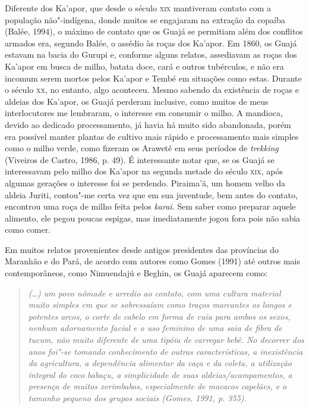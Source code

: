 Diferente dos Ka'apor, que desde o século \textsc{xix} mantiveram contato com a
população não"-indígena, donde muitos se engajaram na extração da copaíba
(Balée, 1994), o máximo de contato que os Guajá se permitiam além dos
conflitos armados era, segundo Balée, o assédio às roças dos Ka'apor. Em
1860, os Guajá estavam na bacia do Gurupi e, conforme alguns relatos,
assediavam as roças dos Ka'apor em busca de milho, batata doce, cará e
outros tubérculos, e não era incomum serem mortos pelos Ka'apor e Tembé
em situações como estas. Durante o século \textsc{xx}, no entanto, algo
aconteceu. Mesmo sabendo da existência de roças e aldeias dos Ka'apor,
os Guajá perderam inclusive, como muitos de meus interlocutores me
lembraram, o interesse em consumir o milho. A mandioca, devido ao
dedicado processamento, já havia há muito sido abandonada, porém era
possível manter plantas de cultivo mais rápido e processamento mais
simples como o milho verde, como fizeram os Araweté em seus períodos de
\emph{trekking} (Viveiros de Castro, 1986, p. 49). É interessante notar
que, se os Guajá se interessavam pelo milho dos Ka'apor na segunda
metade do século \textsc{xix}, após algumas gerações o interesse foi se perdendo.
Piraima'ã, um homem velho da aldeia Juriti, contou"-me certa vez que em
sua juventude, bem antes do contato, encontrou uma roça de milho feita
pelos \emph{karai}. Sem saber como preparar aquele alimento, ele pegou
poucas espigas, mas imediatamente jogou fora pois não sabia como comer.

Em muitos relatos provenientes desde antigos presidentes das províncias
do Maranhão e do Pará, de acordo com autores como Gomes (1991) até
outros mais contemporâneos, como Nimuendajú e Beghin, os Guajá aparecem
como:

\begin{quote}
\emph{(\ldots) um povo nômade e arredio ao contato, com uma cultura material
muito simples em que se sobressaíam como traços marcantes os longos e
potentes arcos, o corte de cabelo em forma de cuia para ambos os sexos,
nenhum adornamento facial e o uso feminino de uma saia de fibra de
tucum, não muito diferente de uma tipóia de carregar bebê. No decorrer
dos anos foi"-se tomando conhecimento de outras características, a
inexistência da agricultura, a dependência alimentar da caça e da
coleta, a utilização integral do coco babaçu, a simplicidade de suas
aldeias/acampamentos, a presença de muitos xerimbabos, especialmente de
macacos capelães, e o tamanho pequeno dos grupos sociais (Gomes, 1991,
p. 355).}
\end{quote}

